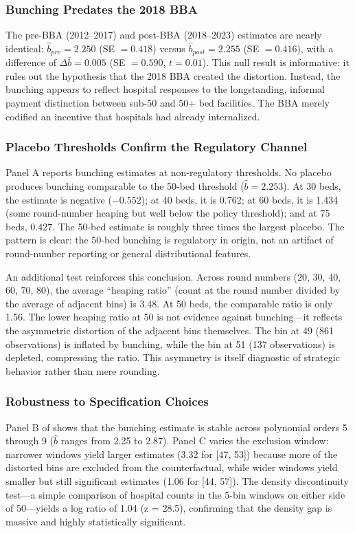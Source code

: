\documentclass[12pt]{article}
\begin{document}


\subsubsection*{Bunching Predates the 2018 BBA} The pre-BBA (2012--2017) and post-BBA (2018--2023) estimates are nearly identical: $\hat{b}_{pre} = 2.250$ (SE $= 0.418$) versus $\hat{b}_{post} = 2.255$ (SE $= 0.416$), with a difference of $\Delta\hat{b} = 0.005$ (SE $= 0.590$, $t = 0.01$). This null result is informative: it rules out the hypothesis that the 2018 BBA created the distortion. Instead, the bunching appears to reflect hospital responses to the longstanding, informal payment distinction between sub-50 and 50+ bed facilities. The BBA merely codified an incentive that hospitals had already internalized.

\subsubsection*{Placebo Thresholds Confirm the Regulatory Channel}  Panel A reports bunching estimates at non-regulatory thresholds. No placebo produces bunching comparable to the 50-bed threshold ($\hat{b} = 2.253$). At 30 beds, the estimate is negative ($-0.552$); at 40 beds, it is 0.762; at 60 beds, it is 1.434 (some round-number heaping but well below the policy threshold); and at 75 beds, 0.427. The 50-bed estimate is roughly three times the largest placebo. The pattern is clear: the 50-bed bunching is regulatory in origin, not an artifact of round-number reporting or general distributional features.

An additional test reinforces this conclusion. Across round numbers (20, 30, 40, 60, 70, 80), the average ``heaping ratio'' (count at the round number divided by the average of adjacent bins) is 3.48. At 50 beds, the comparable ratio is only 1.56. The lower heaping ratio at 50 is not evidence against bunching---it reflects the asymmetric distortion of the adjacent bins themselves. The bin at 49 (861 observations) is inflated by bunching, while the bin at 51 (137 observations) is depleted, compressing the ratio. This asymmetry is itself diagnostic of strategic behavior rather than mere rounding.



\subsubsection*{Robustness to Specification Choices} Panel B of  shows that the bunching estimate is stable across polynomial orders 5 through 9 ($\hat{b}$ ranges from 2.25 to 2.87). Panel C varies the exclusion window: narrower windows yield larger estimates (3.32 for [47, 53]) because more of the distorted bins are excluded from the counterfactual, while wider windows yield smaller but still significant estimates (1.06 for [44, 57]). The density discontinuity test---a simple comparison of hospital counts in the 5-bin windows on either side of 50---yields a log ratio of 1.04 (z = 28.5), confirming that the density gap is massive and highly statistically significant.
\end{document}
